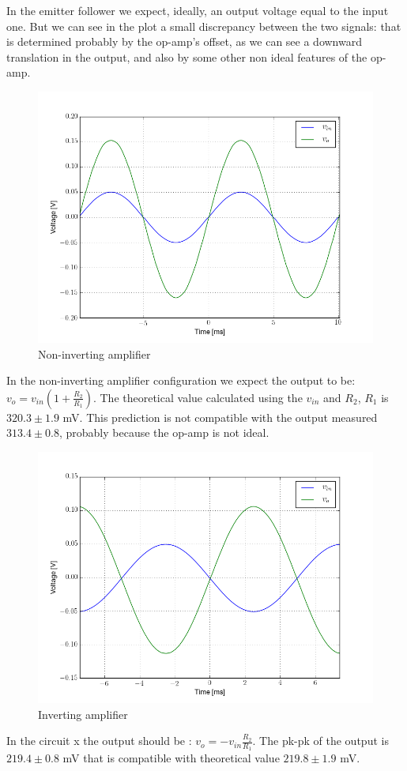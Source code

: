 \documentclass[oneside]{book}
\begin{document}
In the emitter follower we expect, ideally, an output voltage equal to the input one. But we can see in the plot a small discrepancy between the two signals: that is determined probably by the op-amp's offset, as we can see a downward translation in the output, and also by some other non ideal features of the op-amp.
\begin{figure}[H]
\centering
\includegraphics[width=.7\textwidth]{img/scope3.png}
\caption{Non-inverting amplifier}
\end{figure}
In the non-inverting amplifier configuration we expect the output to be: $v_o = v_{in} (1 + \frac{R_2}{R_1})$. The theoretical value calculated using the $v_{in}$ and $R_2$, $R_1$ is $320.3\pm 1.9$ mV. This prediction is not compatible with the output measured $313.4\pm 0.8$, probably because the op-amp is not ideal. 
\begin{figure}[H]
\centering
\includegraphics[width=.7\textwidth]{img/scope4.png}
\caption{Inverting amplifier}
\end{figure}
In the circuit x the output should be : $v_o = - v_{in} \frac{R_2}{R_1}$. The pk-pk of the output is $219.4\pm 0.8$ mV that is compatible with theoretical value $219.8\pm 1.9$ mV.
\end{document}
